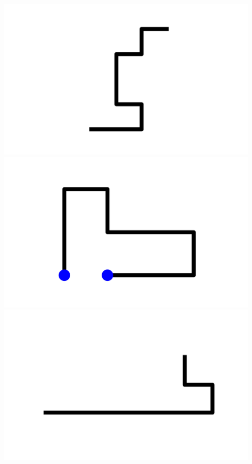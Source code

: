 \documentclass[]{report}
\begin{document}
\includegraphics[scale=.1]{pictures/21/state_cluster_shapes_325.pdf} 
\includegraphics[scale=.1]{pictures/21/state_cluster_shapes_326.pdf} 
\includegraphics[scale=.1]{pictures/21/state_cluster_shapes_327.pdf} 
\end{document}
